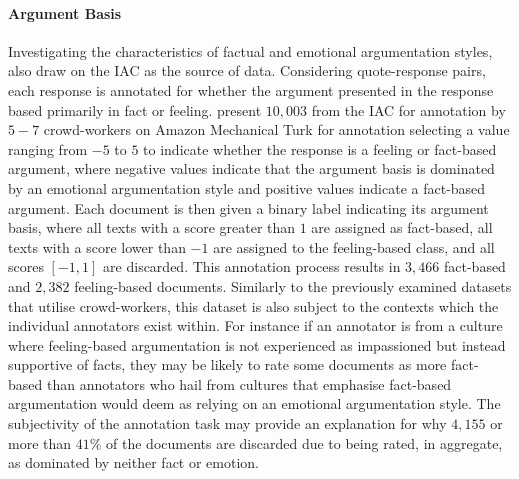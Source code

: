 \paragraph*{Argument Basis} Investigating the characteristics of factual and emotional argumentation styles, \citet{Oraby_factfeel:2015} also draw on the IAC as the source of data. Considering quote-response pairs, each response is annotated for whether the argument presented in the response based primarily in fact or feeling.
\citet{Oraby_factfeel:2015} present $10,003$ from the IAC for annotation by $5-7$ crowd-workers on Amazon Mechanical Turk for annotation selecting a value ranging from $-5$ to $5$ to indicate whether the response is a feeling or fact-based argument, where negative values indicate that the argument basis is dominated by an emotional argumentation style and positive values indicate a fact-based argument.
Each document is then given a binary label indicating its argument basis, where all texts with a score greater than $1$ are assigned as fact-based, all texts with a score lower than $-1$ are assigned to the feeling-based class, and all scores $[-1, 1]$ are discarded.
This annotation process results in $3,466$ fact-based and $2,382$ feeling-based documents.
Similarly to the previously examined datasets that utilise crowd-workers, this dataset is also subject to the contexts which the individual annotators exist within. For instance if an annotator is from a culture where feeling-based argumentation is not experienced as impassioned but instead supportive of facts, they may be likely to rate some documents as more fact-based than annotators who hail from cultures that emphasise fact-based argumentation would deem as relying on an emotional argumentation style.
The subjectivity of the annotation task may provide an explanation for why $4,155$ or more than $41\%$ of the documents are discarded due to being rated, in aggregate, as dominated by neither fact or emotion.

